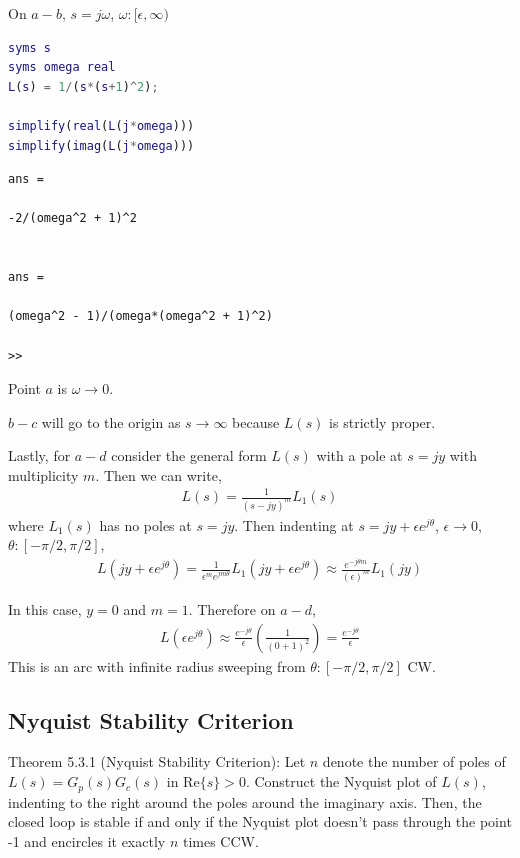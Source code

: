 \documentclass[letterpaper,12pt]{article}
\begin{document}
On $a-b$, $s= j\omega$, $\omega: [\epsilon, \infty)$
\begin{lstlisting}[language=Matlab]
syms s
syms omega real
L(s) = 1/(s*(s+1)^2);

simplify(real(L(j*omega)))
simplify(imag(L(j*omega)))
\end{lstlisting}
\begin{verbatim}
ans =

-2/(omega^2 + 1)^2
    
    
ans =
    
(omega^2 - 1)/(omega*(omega^2 + 1)^2)

>>
\end{verbatim}

Point $a$ is $\omega \to 0$. 

$b-c$ will go to the origin as $s \to \infty$ because $L(s)$ is strictly proper.

Lastly, for $a-d$ consider the general form $L(s)$ with a pole at $s=jy$ with multiplicity $m$. Then we can write,
\begin{align*}
    L(s) = \frac{1}{(s-jy)^m} L_1 (s)
\end{align*}
where $L_1(s)$ has no poles at $s=jy$. Then indenting at $s= jy + \epsilon e^{j\theta}$, $\epsilon \to 0$, $\theta: [-\pi/2, \pi/2]$,
\begin{align*}
    L(jy + \epsilon e^{j\theta}) = \frac{1}{\epsilon^m e^{jm\theta}} L_1(jy + \epsilon e^{j\theta}) \approx \frac{e^{-j \theta m}}{(\epsilon)^m} L_1(jy)
\end{align*}

In this case, $y = 0$ and $m = 1$. Therefore on $a-d$, 
\begin{align*}
    L(\epsilon e^{j\theta}) \approx \frac{e^{-j \theta}}{\epsilon} \left(\frac{1}{(0 + 1)^2}\right) = \frac{e^{-j \theta}}{\epsilon}
\end{align*}
This is an arc with infinite radius sweeping from $\theta: [-\pi/2, \pi/2]$ CW. 

\subsection{Nyquist Stability Criterion}
Theorem 5.3.1 (Nyquist Stability Criterion): Let $n$ denote the number of poles of $L(s) = G_p(s) G_c(s)$ in Re$\{s\} > 0$. Construct
the Nyquist plot of $L(s)$, indenting to the right around the poles around the imaginary axis. Then, the closed loop is stable 
if and only if the Nyquist plot doesn't pass through the point -1 and encircles it exactly $n$ times CCW.
\end{document}
